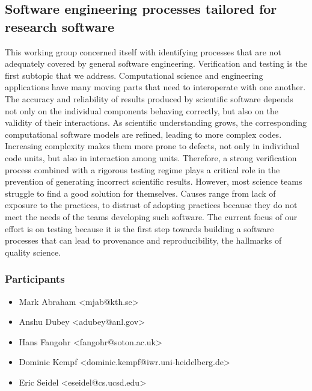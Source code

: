 \subsection{Software engineering processes tailored for research software}
\label{sec:soft-eng}


This working group concerned itself with identifying processes that are not adequately
covered by general software engineering. Verification and testing is
the first subtopic that we address.  
Computational science and engineering applications have many moving
parts that need to interoperate with one another. The accuracy and
reliability of results produced by scientific software depends not
only on the individual components behaving correctly, but also on the
validity of their interactions. 
As scientific understanding grows,
the corresponding computational software models are refined, leading
to more complex codes. Increasing complexity makes them more prone to
defects, not only in individual code units, but also in interaction
among units. Therefore, a strong verification process combined with a
rigorous testing regime plays a critical role in the prevention of
generating incorrect scientific results. However, most science teams
struggle to find a good solution for themselves. Causes range from
lack of exposure to the practices, to distrust of adopting practices
because they do not meet the needs of the teams developing such
software.  The current focus of our effort is on testing because it is the first step
towards building a software processes that can lead to provenance and
reproducibility, the hallmarks of quality science. 

\subsubsection{Participants}
\begin{itemize}
\item Mark Abraham <mjab@kth.se>
\item Anshu Dubey <adubey@anl.gov>
\item Hans Fangohr <fangohr@soton.ac.uk>
\item Dominic Kempf <dominic.kempf@iwr.uni-heidelberg.de>
\item Eric Seidel <eseidel@cs.ucsd.edu>
\end{itemize}

